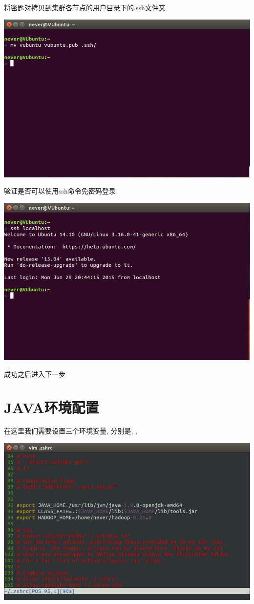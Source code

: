 将密匙对拷贝到集群各节点的用户目录下的.ssh文件夹

\includegraphics[width=\textwidth]{image/env/cr3.png}

验证是否可以使用ssh命令免密码登录

\includegraphics[width=\textwidth]{image/env/cr4.png}

成功之后进入下一步

\section{JAVA环境配置}

在这里我们需要设置三个环境变量, 分别是{\JH}, {\CPATH}, {\HHOME}

\includegraphics[width=\textwidth]{image/env/cr5.png}

